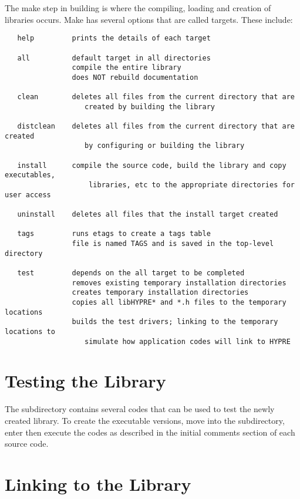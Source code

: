 The make step in building \hypre{} is where the compiling, loading and creation
of libraries occurs.  Make has several options that are called targets.  These
include:
\begin{verbatim}
   help         prints the details of each target

   all          default target in all directories
                compile the entire library
                does NOT rebuild documentation

   clean        deletes all files from the current directory that are 
                   created by building the library

   distclean    deletes all files from the current directory that are created
                   by configuring or building the library

   install      compile the source code, build the library and copy executables,
                    libraries, etc to the appropriate directories for user access

   uninstall    deletes all files that the install target created

   tags         runs etags to create a tags table
                file is named TAGS and is saved in the top-level directory

   test         depends on the all target to be completed
                removes existing temporary installation directories
                creates temporary installation directories
                copies all libHYPRE* and *.h files to the temporary locations
                builds the test drivers; linking to the temporary locations to
                   simulate how application codes will link to HYPRE
\end{verbatim}


\section{Testing the Library} 

The  subdirectory contains several codes that can be used to test
the newly created \hypre{} library.  To create the executable versions, move
into the  subdirectory, enter  then execute the codes as
described in the initial comments section of each source code.


\section{Linking to the Library}

